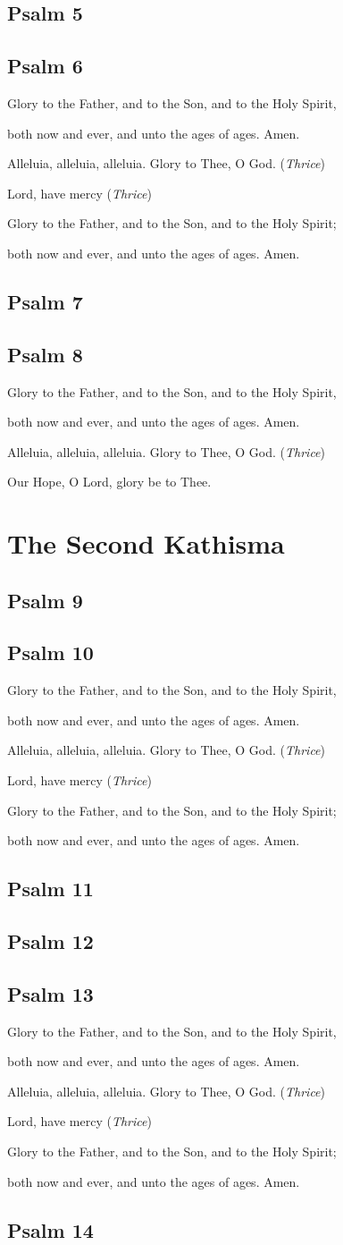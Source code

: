 \documentclass[12pt,openany]{book}
\newcommand{\kathismabreak}{
  \medskip
  \begin{center}
  \begin{footnotesize}
  Glory to the Father, and to the Son, and to the Holy Spirit,
  
  both now and ever, and unto the ages of ages. Amen.

  Alleluia, alleluia, alleluia. Glory to Thee, O God. (\textit{Thrice})

  Lord, have mercy (\textit{Thrice})

  Glory to the Father, and to the Son, and to the Holy Spirit;
  
  both now and ever, and unto the ages of ages. Amen.
  \end{footnotesize}
  \end{center}
  \smallbreak
}
\newcommand{\kathismaend}{
  \medskip
  \begin{center}
  \begin{footnotesize}
  Glory to the Father, and to the Son, and to the Holy Spirit,
  
  both now and ever, and unto the ages of ages. Amen.

  Alleluia, alleluia, alleluia. Glory to Thee, O God. (\textit{Thrice})

  Our Hope, O Lord, glory be to Thee.
  \end{footnotesize}
  \end{center}
  \smallbreak
}
\begin{document}
\section{Psalm 5}

\smallskip
\section{Psalm 6}


\kathismabreak
\smallskip

\section{Psalm 7}

\smallskip
\section{Psalm 8}


\kathismaend

\chapter*{The Second Kathisma}
\smallskip
\section{Psalm 9}

\smallskip
\section{Psalm 10}


\kathismabreak
\smallskip
\pagebreak %

\section{Psalm 11}

\smallskip
\section{Psalm 12}

\smallskip
\section{Psalm 13}


\kathismabreak
\section{Psalm 14}

\smallskip
\end{document}
